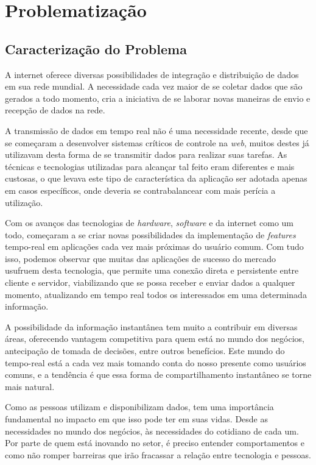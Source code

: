 \chapter{Problematização}
\section{Caracterização do Problema}
A internet oferece diversas possibilidades de integração e distribuição de dados em sua rede mundial. A necessidade cada vez maior de se coletar dados que são gerados a todo momento, cria a iniciativa de se laborar novas maneiras de envio e recepção de dados na rede.

A transmissão de dados em tempo real não é uma necessidade recente, desde que se começaram a desenvolver sistemas críticos de controle na \textit{web}, muitos destes já utilizavam desta forma de se transmitir dados para realizar suas tarefas. As técnicas e tecnologias utilizadas para alcançar tal feito eram diferentes e mais custosas, o que levava este tipo de característica da aplicação ser adotada apenas em casos específicos, onde deveria se contrabalancear com mais perícia a utilização.

Com os avanços das tecnologias de \textit{hardware}, \textit{software} e da internet como um todo, começaram a se criar novas possibilidades da implementação de \textit{features} tempo-real em aplicações cada vez mais próximas do usuário comum. Com tudo isso, podemos observar que muitas das aplicações de sucesso do mercado usufruem desta tecnologia, que permite uma conexão direta e persistente entre cliente e servidor, viabilizando que se possa receber e enviar dados a qualquer momento, atualizando em tempo real todos os interessados em uma determinada informação.

A possibilidade da informação instantânea tem muito a contribuir em diversas áreas, oferecendo vantagem competitiva para quem está no mundo dos negócios, antecipação de tomada de decisões, entre outros benefícios. Este mundo do tempo-real está a cada vez mais tomando conta do nosso presente como usuários comuns, e a tendência é que essa forma de compartilhamento instantâneo se torne mais natural.

Como as pessoas utilizam e disponibilizam dados, tem uma importância fundamental no impacto em que isso pode ter em suas vidas. Desde as necessidades no mundo dos negócios, às necessidades do cotidiano de cada um. Por parte de quem está inovando no setor, é preciso entender comportamentos e como não romper barreiras que irão fracassar a relação entre tecnologia e pessoas. 

